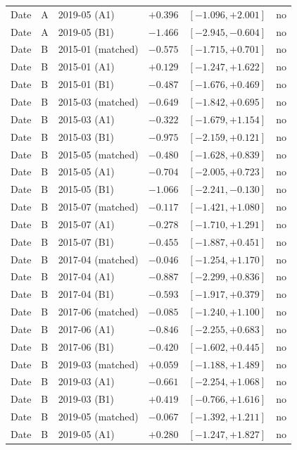 \begin{table}[H]
\begin{tabular}{lllrrr}
Date & A & 2019-05 (A1) & $+0.396$ & $[-1.096, +2.001]$ & no \\
Date & A & 2019-05 (B1) & $-1.466$ & $[-2.945, -0.604]$ & no \\
Date & B & 2015-01 (matched) & $-0.575$ & $[-1.715, +0.701]$ & no \\
Date & B & 2015-01 (A1) & $+0.129$ & $[-1.247, +1.622]$ & no \\
Date & B & 2015-01 (B1) & $-0.487$ & $[-1.676, +0.469]$ & no \\
Date & B & 2015-03 (matched) & $-0.649$ & $[-1.842, +0.695]$ & no \\
Date & B & 2015-03 (A1) & $-0.322$ & $[-1.679, +1.154]$ & no \\
Date & B & 2015-03 (B1) & $-0.975$ & $[-2.159, +0.121]$ & no \\
Date & B & 2015-05 (matched) & $-0.480$ & $[-1.628, +0.839]$ & no \\
Date & B & 2015-05 (A1) & $-0.704$ & $[-2.005, +0.723]$ & no \\
Date & B & 2015-05 (B1) & $-1.066$ & $[-2.241, -0.130]$ & no \\
Date & B & 2015-07 (matched) & $-0.117$ & $[-1.421, +1.080]$ & no \\
Date & B & 2015-07 (A1) & $-0.278$ & $[-1.710, +1.291]$ & no \\
Date & B & 2015-07 (B1) & $-0.455$ & $[-1.887, +0.451]$ & no \\
Date & B & 2017-04 (matched) & $-0.046$ & $[-1.254, +1.170]$ & no \\
Date & B & 2017-04 (A1) & $-0.887$ & $[-2.299, +0.836]$ & no \\
Date & B & 2017-04 (B1) & $-0.593$ & $[-1.917, +0.379]$ & no \\
Date & B & 2017-06 (matched) & $-0.085$ & $[-1.240, +1.100]$ & no \\
Date & B & 2017-06 (A1) & $-0.846$ & $[-2.255, +0.683]$ & no \\
Date & B & 2017-06 (B1) & $-0.420$ & $[-1.602, +0.445]$ & no \\
Date & B & 2019-03 (matched) & $+0.059$ & $[-1.188, +1.489]$ & no \\
Date & B & 2019-03 (A1) & $-0.661$ & $[-2.254, +1.068]$ & no \\
Date & B & 2019-03 (B1) & $+0.419$ & $[-0.766, +1.616]$ & no \\
Date & B & 2019-05 (matched) & $-0.067$ & $[-1.392, +1.211]$ & no \\
Date & B & 2019-05 (A1) & $+0.280$ & $[-1.247, +1.827]$ & no \\

\end{tabular}
\end{table}
